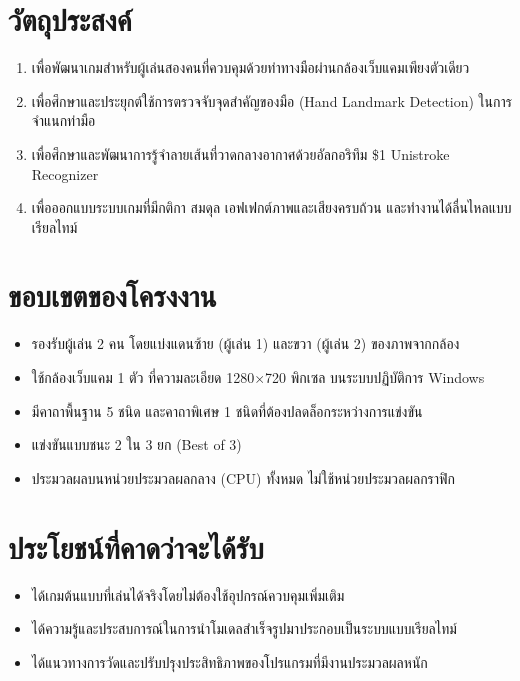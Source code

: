 \documentclass[12pt,a4paper]{report}
\begin{document}
\section{วัตถุประสงค์}
\begin{enumerate}[leftmargin=2cm]
  \item เพื่อพัฒนาเกมสำหรับผู้เล่นสองคนที่ควบคุมด้วยท่าทางมือผ่านกล้องเว็บแคมเพียงตัวเดียว
  \item เพื่อศึกษาและประยุกต์ใช้การตรวจจับจุดสำคัญของมือ (Hand Landmark Detection) ในการจำแนกท่ามือ
  \item เพื่อศึกษาและพัฒนาการรู้จำลายเส้นที่วาดกลางอากาศด้วยอัลกอริทึม \$1 Unistroke Recognizer
  \item เพื่อออกแบบระบบเกมที่มีกติกา สมดุล เอฟเฟกต์ภาพและเสียงครบถ้วน และทำงานได้ลื่นไหลแบบเรียลไทม์
\end{enumerate}

\section{ขอบเขตของโครงงาน}
\begin{itemize}[leftmargin=2cm]
  \item รองรับผู้เล่น 2 คน โดยแบ่งแดนซ้าย (ผู้เล่น 1) และขวา (ผู้เล่น 2) ของภาพจากกล้อง
  \item ใช้กล้องเว็บแคม 1 ตัว ที่ความละเอียด 1280$\times$720 พิกเซล บนระบบปฏิบัติการ Windows
  \item มีคาถาพื้นฐาน 5 ชนิด และคาถาพิเศษ 1 ชนิดที่ต้องปลดล็อกระหว่างการแข่งขัน
  \item แข่งขันแบบชนะ 2 ใน 3 ยก (Best of 3)
  \item ประมวลผลบนหน่วยประมวลผลกลาง (CPU) ทั้งหมด ไม่ใช้หน่วยประมวลผลกราฟิก
\end{itemize}

\section{ประโยชน์ที่คาดว่าจะได้รับ}
\begin{itemize}[leftmargin=2cm]
  \item ได้เกมต้นแบบที่เล่นได้จริงโดยไม่ต้องใช้อุปกรณ์ควบคุมเพิ่มเติม
  \item ได้ความรู้และประสบการณ์ในการนำโมเดลสำเร็จรูปมาประกอบเป็นระบบแบบเรียลไทม์
  \item ได้แนวทางการวัดและปรับปรุงประสิทธิภาพของโปรแกรมที่มีงานประมวลผลหนัก
\end{itemize}
\end{document}
